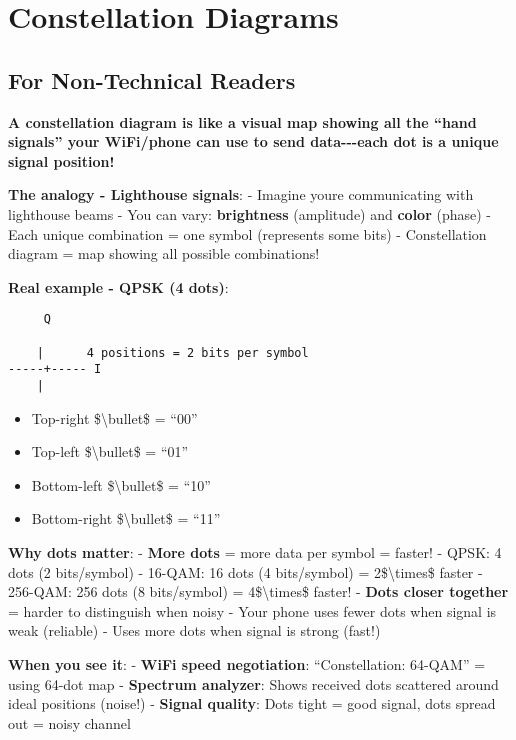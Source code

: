\section{Constellation Diagrams}\label{constellation-diagrams}

\subsection{\texorpdfstring{ For Non-Technical
Readers}{ For Non-Technical Readers}}\label{for-non-technical-readers}

\textbf{A constellation diagram is like a visual map showing all the
``hand signals'' your WiFi/phone can use to send data-\/-\/-each dot is
a unique signal position!}

\textbf{The analogy - Lighthouse signals}: - Imagine
you\textquotesingle re communicating with lighthouse beams - You can
vary: \textbf{brightness} (amplitude) and \textbf{color} (phase) - Each
unique combination = one symbol (represents some bits) - Constellation
diagram = map showing all possible combinations!

\textbf{Real example - QPSK (4 dots)}:

\begin{verbatim}
     Q
     
    |      4 positions = 2 bits per symbol
-----+----- I
    |  
\end{verbatim}

\begin{itemize}
\tightlist
\item
  Top-right \$\textbackslash bullet\$ = ``00''
\item
  Top-left \$\textbackslash bullet\$ = ``01''
\item
  Bottom-left \$\textbackslash bullet\$ = ``10''
\item
  Bottom-right \$\textbackslash bullet\$ = ``11''
\end{itemize}

\textbf{Why dots matter}: - \textbf{More dots} = more data per symbol =
faster! - QPSK: 4 dots (2 bits/symbol) - 16-QAM: 16 dots (4 bits/symbol)
= 2\$\textbackslash times\$ faster - 256-QAM: 256 dots (8 bits/symbol) =
4\$\textbackslash times\$ faster! - \textbf{Dots closer together} =
harder to distinguish when noisy - Your phone uses fewer dots when
signal is weak (reliable) - Uses more dots when signal is strong (fast!)

\textbf{When you see it}: - \textbf{WiFi speed negotiation}:
``Constellation: 64-QAM'' = using 64-dot map - \textbf{Spectrum
analyzer}: Shows received dots scattered around ideal positions (noise!)
- \textbf{Signal quality}: Dots tight = good signal, dots spread out =
noisy channel

